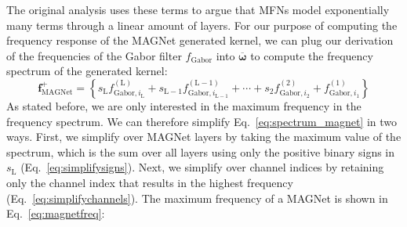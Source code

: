 \documentclass{article} \usepackage{iclr2022_conference,times}
\begin{document}
The original analysis uses these terms to argue that MFNs model exponentially many terms through a linear amount of layers. For our purpose of computing the frequency response of the MAGNet generated kernel, we can plug our derivation of the frequencies of the Gabor filter $f_\mathrm{Gabor}$ into $\boldsymbol{\overline{\omega}}$ to compute the frequency spectrum of the generated kernel:
\begin{equation} \label{eq:spectrum_magnet}
    \boldsymbol{f}^+_{\textrm{MAGNet}} = \left\{ s_\mathrm{L} f^{(\mathrm{L})}_{\mathrm{Gabor}, i_\mathrm{L}} + s_{\mathrm{L}-1} f^{(\mathrm{L}-1)}_{\mathrm{Gabor}, i_{\mathrm{L}-1}}  + \cdots + s_2 f^{(2)}_{\mathrm{Gabor}, i_2} + f^{ (1)}_{\mathrm{Gabor}, i_1} \right\}
\end{equation}
As stated before, we are only interested in the maximum frequency in the frequency spectrum. We can therefore simplify Eq.~\ref{eq:spectrum_magnet} in two ways. First, we simplify over MAGNet layers by taking the maximum value of the spectrum, which is the sum over all layers using only the positive binary signs in $s_\mathrm{L}$ (Eq.~\ref{eq:simplifysigns}). Next, we simplify over channel indices by retaining only the channel index that results in the highest frequency (Eq.~\ref{eq:simplifychannels}). The maximum frequency of a MAGNet is shown in Eq.~\ref{eq:magnetfreq}: 
\end{document}
